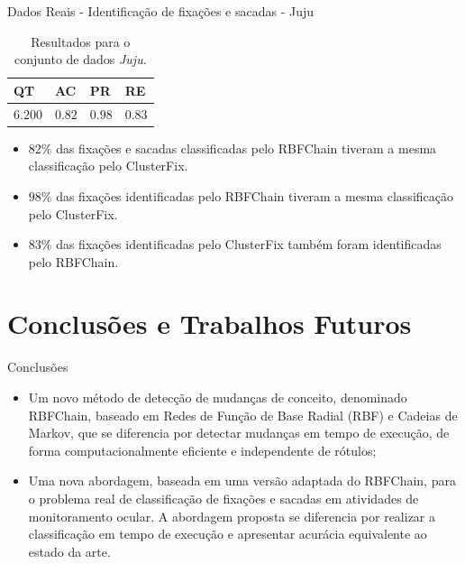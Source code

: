 \documentclass[10pt]{beamer}
\begin{document}
\begin{frame}{Dados Reais - Identificação de fixações e sacadas -  Juju}
    \begin{table}[ht!]
        \centering
        \caption{Resultados para o conjunto de dados \textit{Juju}.}
        \label{tbl:juju}
        \begin{tabular}{llll}

        \toprule
        QT              & AC                     & PR                     & RE      \\
        \midrule
        $6.200$         & $0.82$                 & $0.98$                 & $0.83$      \\
        \bottomrule

        \end{tabular}
    \end{table}

    \begin{itemize}
        \item \alert{$82\%$} das fixações e sacadas classificadas pelo RBFChain tiveram a mesma classificação pelo ClusterFix.
        \item \alert{$98\%$} das fixações identificadas pelo RBFChain tiveram a mesma classificação pelo ClusterFix.
        \item \alert{$83\%$} das fixações identificadas pelo ClusterFix também foram identificadas pelo RBFChain.
    \end{itemize}
\end{frame}

\section{Conclusões e Trabalhos Futuros}

\begin{frame}{Conclusões}
    \begin{itemize}
        \item Um novo método de detecção de mudanças de conceito, denominado RBFChain, baseado em Redes de Função de Base Radial (RBF) e Cadeias de Markov, que se diferencia por detectar mudanças em tempo de execução, de forma computacionalmente eficiente e independente de rótulos;
        \item Uma nova abordagem, baseada em uma versão adaptada do RBFChain, para o problema real de classificação de fixações e sacadas em atividades de monitoramento ocular.
        A abordagem proposta se diferencia por realizar a classificação em tempo de execução e apresentar acurácia equivalente ao estado da arte.
    \end{itemize}
\end{frame}
\end{document}
